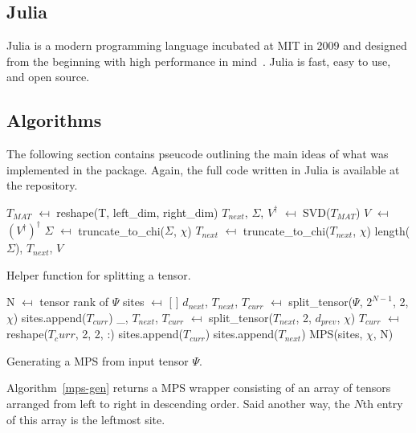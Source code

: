\documentclass[12pt]{article}
\begin{document}
\begin{multicols}{2}
	\subsection{Julia}
	Julia is a modern programming language incubated at MIT in 2009 and
	designed from the beginning with high performance in mind~\cite{Julia-lang}.
	Julia is fast, easy to use, and open source.
	\subsection{Algorithms}
	The following section contains pseucode outlining the main ideas
	of what was implemented in the package. Again, the full code written
	in Julia is available at the repository.
	\begin{algorithm}[H]
		$T_{MAT}$ $\mapsfrom$ reshape(T, left\_dim, right\_dim)\;
		$T_{next}$, $\Sigma$, $V^\dagger$ $\mapsfrom$ SVD($T_{MAT}$)\;
		$V$ $\mapsfrom$ $(V^\dagger)^\dagger$\;
		$\Sigma$ $\mapsfrom$ truncate\_to\_chi($\Sigma$, $\chi$)\;
		$T_{next}$ $\mapsfrom$ truncate\_to\_chi($T_{next}$, $\chi$)\;
		\Return length($\Sigma$), $T_{next}$, $V$\;
		\caption{Helper function for splitting a tensor.}
		\label{split-tensor}
	\end{algorithm}
	\vspace{20px}
	\begin{algorithm}[H]
		N $\mapsfrom$ tensor rank of $\Psi$\;
		sites $\mapsfrom$ [ ]\;
		$d_{next}$, $T_{next}$, $T_{curr}$ $\mapsfrom$ split\_tensor($\Psi$, $2^{N-1}$, 2, $\chi$)\;
		sites.append($T_{curr}$)\;
		\_, $T_{next}$, $T_{curr}$ $\mapsfrom$ split\_tensor($T_{next}$, 2, $d_{prev}$, $\chi$)\;
		$T_{curr}$ $\mapsfrom$ reshape($T_curr$, 2, 2, :)\;
		sites.append($T_{curr}$)\;
		sites.append($T_{next}$)\;
		\Return MPS(sites, $\chi$, N)\;
		\caption{Generating a MPS from input tensor $\Psi$.}
		\label{mps-gen}
	\end{algorithm}

		Algorithm~\ref{mps-gen} returns a MPS wrapper consisting of an array of
		tensors arranged from left to right in descending order. Said another way,
		the $N$th entry of this array is the leftmost site.


\end{multicols}
\end{document}
